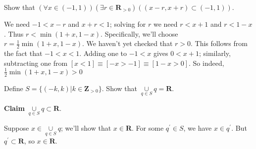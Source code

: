 \documentclass[12pt,fleqn,answers]{exam}
\newcommand{\reals}{\mathbf{R}}
\newcommand{\integers}{\mathbf{Z}}
\begin{document}
\begin{questions} 

\question[5] Show that
\(
 \left(\forall x \in (-1,1) \right) 
  \left(\exists r \in \reals_{>0} \right)
    \left( (x-r,x+r) \subset (-1,1) \right)
\).

\begin{solution}  
  We need $-1 < x-r$ and $x+r < 1$; solving for $r$ we need
  $r < x+1$ and $r < 1-x$. Thus $r < \min(1+x,1-x)$. Specifically,
  we'll choose $r = \frac{1}{2} \min(1+x,1-x)$. We haven't yet checked
  that $r > 0$.  This follows from the fact that $-1 < x < 1$. 
  Adding one to $-1 < x$ gives $0 < x + 1$; similarly, subtracting
  one from $[x < 1] \equiv [-x > -1] \equiv [1-x > 0]$. So indeed,
  $\frac{1}{2} \min(1+x,1-x) > 0$


\end{solution}

\question[5] Define $S = \{(-k,k) | k \in \integers_{>0} \}$. Show that
 $\underset{q \in S}{\cup} q = \reals$.
 \begin{solution}  

  \textbf{Claim} $\underset{q \in S}{\cup} q \subset \reals$. 

  Suppose $x \in  \underset{q \in S}{\cup} q$; we'll show
  that $x \in \reals$.  For some
  $q^\prime \in S$, we have $x \in q^\prime$.  But $q^\prime \subset \reals$,
  so $x \in \reals$. 
 \end{solution}


\end{questions}
\end{document}
